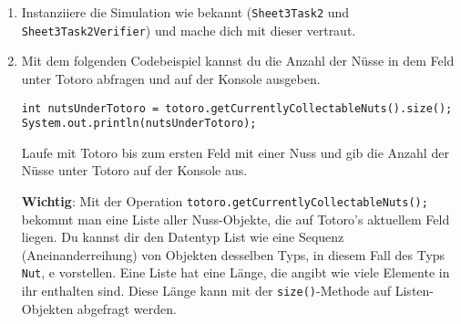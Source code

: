 
\begin{enumerate}
	\item
	Instanziiere die Simulation wie bekannt (\lstinline{Sheet3Task2} und \lstinline{Sheet3Task2Verifier}) und mache dich mit dieser vertraut.

	\item
		Mit dem folgenden Codebeispiel kannst du die Anzahl der Nüsse in dem Feld unter Totoro abfragen und auf der Konsole ausgeben.

		\begin{lstlisting}
int nutsUnderTotoro = totoro.getCurrentlyCollectableNuts().size();
System.out.println(nutsUnderTotoro);
		\end{lstlisting}

		Laufe mit Totoro bis zum ersten Feld mit einer Nuss und gib die Anzahl der Nüsse unter Totoro auf der Konsole aus.\newline

		\textbf{Wichtig}: Mit der Operation \lstinline{totoro.getCurrentlyCollectableNuts();} bekommt man eine Liste aller Nuss-Objekte, die auf Totoro's aktuellem Feld liegen.
		Du kannst dir den Datentyp List wie eine Sequenz (Aneinanderreihung) von Objekten desselben Typs, in diesem Fall des Typs \lstinline{Nut}, e vorstellen.
		Eine Liste hat eine Länge, die angibt wie viele Elemente in ihr enthalten sind.
		Diese Länge kann mit der \lstinline{size()}-Methode auf Listen-Objekten abgefragt werden.
\end{enumerate}


